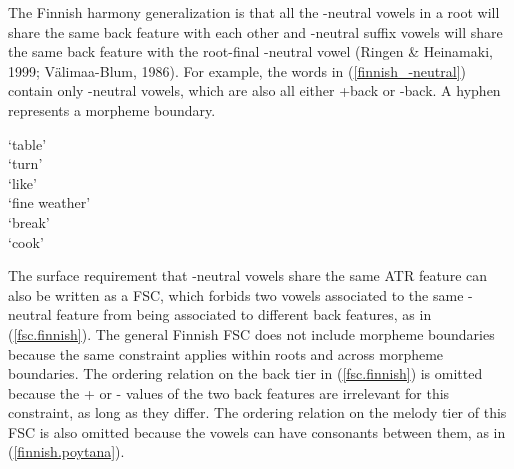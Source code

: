 \documentclass[floatsintext,man]{apa6}
\theoremstyle{definition}
\theoremstyle{definition}
\theoremstyle{definition}
\theoremstyle{remark}
\begin{document}
The Finnish harmony generalization is that all the -neutral vowels in a
root will share the same back feature with each other and -neutral
suffix vowels will share the same back feature with the root-final
-neutral vowel (Ringen \& Heinamaki, 1999; Välimaa-Blum, 1986). For
example, the words in (\ref{finnish_-neutral}) contain only -neutral
vowels, which are also all either +back or -back. A hyphen represents a
morpheme boundary.

\begin{exe}
\label{finnish_-neutral}
\begin{xlist}
  \ex {} `table' \\
  \ex {} `turn' \\
  \ex {} `like' \\
  \ex {} `fine weather' \\
  \ex {} `break' \\
  \ex {} `cook' \\
  \end{xlist}
\end{exe}

The surface requirement that -neutral vowels share the same ATR feature
can also be written as a FSC, which forbids two vowels associated to the
same -neutral feature from being associated to different back features,
as in (\ref{fsc.finnish}). The general Finnish FSC does not include
morpheme boundaries because the same constraint applies within roots and
across morpheme boundaries. The ordering relation on the back tier in
(\ref{fsc.finnish}) is omitted because the + or - values of the two back
features are irrelevant for this constraint, as long as they differ. The
ordering relation on the melody tier of this FSC is also omitted because
the vowels can have consonants between them, as in
(\ref{finnish.poytana}).

\begin{exe}
\ex \label{fsc.finnish}
\end{exe}
\end{document}
